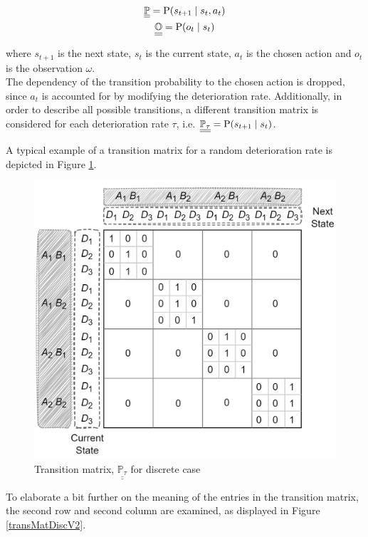 \begin{gather}
    \underline{\underline{\mathbb{P}}} = \text{P}(s_{t+1} \mid s_t, a_t) \\
    \underline{\underline{\mathbb{O}}} = \text{P}(o_t \mid s_t)
\end{gather}

where $s_{t+1}$ is the next state, $s_t$ is the current state, $a_t$ is the chosen action and $o_t$ is the observation $\omega$.\\

The dependency of the transition probability to the chosen action is dropped, since $a_t$ is accounted for by modifying the deterioration rate. Additionally, in order to describe all possible transitions, a different transition matrix is considered for each deterioration rate $\tau$, i.e. $\underline{\underline{\mathbb{P}_{\tau}}} = \text{P}(s_{t+1} \mid s_t)$.

\newpage

A typical example of a transition matrix for a random deterioration rate is depicted in Figure \ref{transMatDisc}.

\begin{figure}[H]
    \centering
	\includegraphics[width=0.65\linewidth]{Figures/transMatDiscrete.png}
	\caption[Transition matrix, $\underline{\underline{\mathbb{P}_{\tau}}}$ for discrete case]{Transition matrix, $\underline{\underline{\mathbb{P}_{\tau}}}$ for discrete case\protect\footnotemark} 
	\label{transMatDisc}
\end{figure}

To elaborate a bit further on the meaning of the entries in the transition matrix, the second row and second column are examined, as displayed in Figure \ref{transMatDiscV2}.


